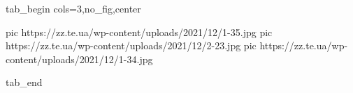  
 
 
 
 


\ifcmt
  tab_begin cols=3,no_fig,center

     pic https://zz.te.ua/wp-content/uploads/2021/12/1-35.jpg
		 pic https://zz.te.ua/wp-content/uploads/2021/12/2-23.jpg
		 pic https://zz.te.ua/wp-content/uploads/2021/12/1-34.jpg

  tab_end
\fi
